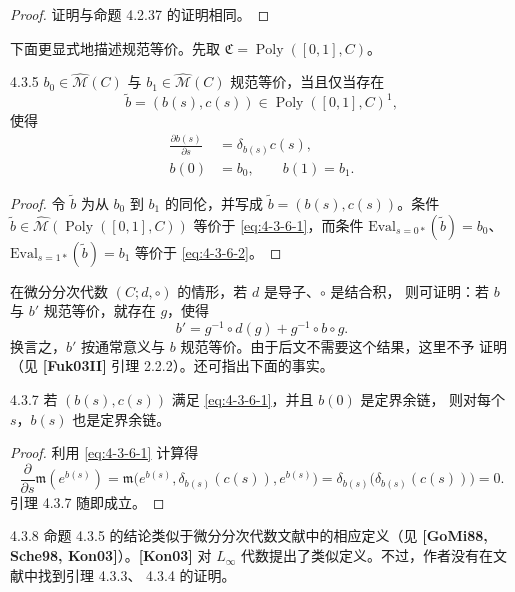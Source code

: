 \begin{proof}
证明与命题 4.2.37 的证明相同。
\end{proof}

下面更显式地描述规范等价。先取
$\mathfrak C=\operatorname{Poly}([0,1],C)$。

\begin{proposition}{4.3.5}\label{prop:4-3-5}
$b_0\in\widehat{\mathcal M}(C)$ 与
$b_1\in\widehat{\mathcal M}(C)$ 规范等价，当且仅当存在
\[
 \widetilde b=(b(s),c(s))
 \in\operatorname{Poly}([0,1],C)^1,
\]
使得
\begin{align}
 \frac{\partial b(s)}{\partial s}
 &=\delta_{b(s)}c(s),
 \tag{4.3.6.1}\label{eq:4-3-6-1}\\
 b(0)&=b_0,\qquad b(1)=b_1.
 \tag{4.3.6.2}\label{eq:4-3-6-2}
\end{align}
\end{proposition}

\begin{proof}
令 $\widetilde b$ 为从 $b_0$ 到 $b_1$ 的同伦，并写成
$\widetilde b=(b(s),c(s))$。条件
$\widetilde b\in\widehat{\mathcal M}
(\operatorname{Poly}([0,1],C))$ 等价于 \eqref{eq:4-3-6-1}，而条件
$\mathrm{Eval}_{s=0*}(\widetilde b)=b_0$、
$\mathrm{Eval}_{s=1*}(\widetilde b)=b_1$ 等价于
\eqref{eq:4-3-6-2}。
\end{proof}

在微分分次代数 $(C;d,\circ)$ 的情形，若 $d$ 是导子、$\circ$ 是结合积，
则可证明：若 $b$ 与 $b'$ 规范等价，就存在 $g$，使得
\[
 b'=g^{-1}\circ d(g)+g^{-1}\circ b\circ g.
\]
换言之，$b'$ 按通常意义与 $b$ 规范等价。由于后文不需要这个结果，这里不予
证明（见 \textbf{[Fuk03II]} 引理 2.2.2）。还可指出下面的事实。

\begin{lemma}{4.3.7}\label{lem:4-3-7}
若 $(b(s),c(s))$ 满足 \eqref{eq:4-3-6-1}，并且 $b(0)$ 是定界余链，
则对每个 $s$，$b(s)$ 也是定界余链。
\end{lemma}

\begin{proof}
利用 \eqref{eq:4-3-6-1} 计算得
\[
 \frac{\partial}{\partial s}\mathfrak m(e^{b(s)})
 =\mathfrak m\bigl(e^{b(s)},\delta_{b(s)}(c(s)),e^{b(s)}\bigr)
 =\delta_{b(s)}\bigl(\delta_{b(s)}(c(s))\bigr)=0.
\]
引理 4.3.7 随即成立。
\end{proof}

\begin{remark}{4.3.8}\label{rem:4-3-8}
命题 4.3.5 的结论类似于微分分次代数文献中的相应定义（见
\textbf{[GoMi88, Sche98, Kon03]}）。\textbf{[Kon03]} 对
$L_\infty$ 代数提出了类似定义。不过，作者没有在文献中找到引理 4.3.3、
4.3.4 的证明。
\end{remark}

